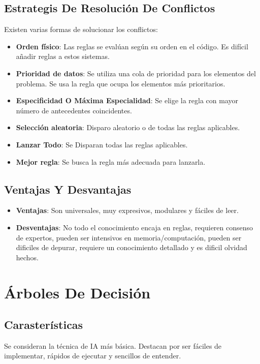 \subsection{Estrategis De Resolución De Conflictos}
Existen varias formas de solucionar los conflictos:
\begin{itemize}
    \item \textbf{Orden físico}: Las reglas se evalúan según su orden en el código.  Es difícil añadir reglas a estos sistemas.
    \item \textbf{Prioridad de datos}: Se utiliza una cola de prioridad para los elementos del problema. Se usa la regla que ocupa los elementos más prioritarios.
    \item \textbf{Especificidad O Máxima Especialidad}: Se elige la regla con mayor número de antecedentes coincidentes.
    \item \textbf{Selección aleatoria}: Disparo aleatorio o de todas las reglas aplicables.
    \item \textbf{Lanzar Todo}: Se Disparan todas las reglas aplicables.
    \item \textbf{Mejor regla}: Se busca la regla más adecuada para lanzarla.
\end{itemize}

\subsection{Ventajas Y Desvantajas}
\begin{itemize}
    \item \textbf{Ventajas}: Son universales, muy expresivos, modulares y fáciles de leer.
    \item \textbf{Desventajas}: No todo el conocimiento encaja en reglas, requieren consenso de expertos, pueden ser intensivos en memoria/computación, pueden ser dificiles de depurar, requiere un conocimiento detallado y es dificil olvidad hechos.
\end{itemize}

\section{Árboles De Decisión}
\subsection{Carasterísticas}
Se consideran la técnica de IA más básica. Destacan por ser fáciles de implementar, rápidos de ejecutar y sencillos de entender.


